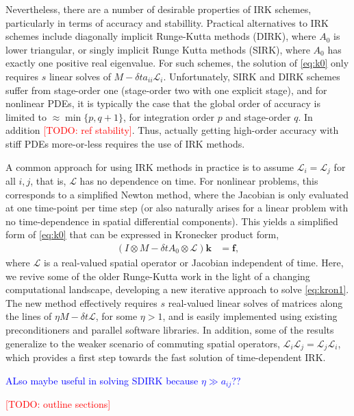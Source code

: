 \documentclass[review]{siamart}
\makeatletter
\newcommand{\tcb}{\textcolor{blue}}
\newcommand{\todo}[1]{\textcolor{red}{[TODO\@: #1]}}
\makeatother
\begin{document}
Nevertheless, there are a number of desirable properties of IRK schemes, particularly
in terms of accuracy and stabillity. Practical alternatives to IRK schemes include
diagonally implicit Runge-Kutta methods (DIRK), where $A_0$ is lower triangular, or
singly implicit Runge Kutta methods (SIRK), where $A_0$ has exactly one positive real
eigenvalue. For such schemes, the solution of \eqref{eq:k0} only requires $s$ linear
solves of $M - \delta ta_{ii}\mathcal{L}_i$. Unfortunately, SIRK and DIRK schemes
suffer from stage-order one (stage-order two with one explicit stage), and for nonlinear
PDEs, it is typically the case that the global order of accuracy is limited to
$\approx \min\{ p, q+1\}$, for integration order $p$ and stage-order $q$. In addition
\todo{ref stability}. Thus, actually getting high-order accuracy with stiff PDEs
more-or-less requires the use of IRK methods.

A common approach for using IRK methods in practice is to assume $\mathcal{L}_i =
\mathcal{L}_j$ for all $i,j$, that is, $\mathcal{L}$ has no dependence on time. For
nonlinear problems, this corresponds to a simplified Newton method, where the Jacobian
is only evaluated at one time-point per time step (or also naturally arises for a
linear problem with no time-dependence in spatial differential components). This
yields a simplified form of \eqref{eq:k0} that can be expressed in Kronecker product
form,
%
\begin{align}\label{eq:kron1}
(I\otimes M - \delta t A_0\otimes \mathcal{L})\mathbf{k} & = \mathbf{f},
\end{align}
%
where $\mathcal{L}$ is a real-valued spatial operator or Jacobian independent of time.
Here, we revive some of the older Runge-Kutta work in the light of a changing
computational landscape, developing a new iterative approach to solve \eqref{eq:kron1}.
The new method effectively requires $s$ real-valued linear solves of matrices along the
lines of $\eta M - \delta t\mathcal{L}$, for some $\eta > 1$, and is easily implemented
using existing preconditioners and parallel software libraries. In addition, some of
the results generalize to the weaker scenario of commuting spatial operators,
$\mathcal{L}_i\mathcal{L}_j = \mathcal{L}_j\mathcal{L}_i$,
which provides a first step towards the fast solution of time-dependent IRK.

\tcb{ALso maybe useful in solving SDIRK because $\eta \gg a_{ij}$??}


\todo{outline sections}
\end{document}
